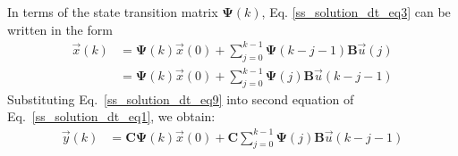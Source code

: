 \documentclass[11pt,a4paper,oneside]{book}
\numberwithin{equation}{section}
\theoremstyle{it}
\theoremstyle{definition}
\begin{document}
In terms of the state transition matrix $\mathbf{\Psi}(k)$, Eq. 
\ref{ss_solution_dt_eq3} can be 
written in the form
\begin{equation}\label{ss_solution_dt_eq9}
	\begin{aligned}
		\vec{x}(k) &= 
		\mathbf{\Psi}(k)\vec{x}(0)+\sum_{j=0}^{k-1}\mathbf{\Psi}(k-j-1)\mathbf{B}\vec{u}(j)
		 \\[6pt]
		&=\mathbf{\Psi}(k)\vec{x}(0)+\sum_{j=0}^{k-1}\mathbf{\Psi}(j)\mathbf{B}\vec{u}(k-j-1)
	\end{aligned}
\end{equation}
Substituting Eq.~\eqref{ss_solution_dt_eq9} into second equation of 
Eq.~\eqref{ss_solution_dt_eq1}, we obtain:
\begin{equation}\label{ss_solution_dt_eq10}
	\begin{aligned}
		\vec{y}(k) &= 
		\mathbf{C}\mathbf{\Psi}(k)\vec{x}(0)+\mathbf{C}\sum_{j=0}^{k-1}\mathbf{\Psi}(j)\mathbf{B}\vec{u}(k-j-1)
	\end{aligned}
\end{equation}
\end{document}
